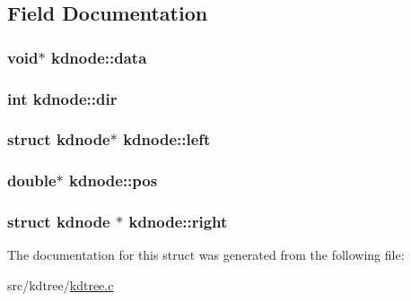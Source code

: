 \subsection{Field Documentation}
\hypertarget{structkdnode_ac14038f51e15cb1bb26abe6558d36a3d}{
\subsubsection[{data}]{\setlength{\rightskip}{0pt plus 5cm}void$\ast$ kdnode\+::data}}\label{structkdnode_ac14038f51e15cb1bb26abe6558d36a3d}
\hypertarget{structkdnode_aa3b02f2e7995f08cd16a85ea93e1fc80}{
\subsubsection[{dir}]{\setlength{\rightskip}{0pt plus 5cm}int kdnode\+::dir}}\label{structkdnode_aa3b02f2e7995f08cd16a85ea93e1fc80}
\hypertarget{structkdnode_a5011f2e53a829b362c8d034f005e6a04}{
\subsubsection[{left}]{\setlength{\rightskip}{0pt plus 5cm}struct {\bf kdnode}$\ast$ kdnode\+::left}}\label{structkdnode_a5011f2e53a829b362c8d034f005e6a04}
\hypertarget{structkdnode_af92e7d95a2845d3e8611b289d6398a83}{
\subsubsection[{pos}]{\setlength{\rightskip}{0pt plus 5cm}double$\ast$ kdnode\+::pos}}\label{structkdnode_af92e7d95a2845d3e8611b289d6398a83}
\hypertarget{structkdnode_a560fdae1b98325057e95c817f76bee67}{
\subsubsection[{right}]{\setlength{\rightskip}{0pt plus 5cm}struct {\bf kdnode} $\ast$ kdnode\+::right}}\label{structkdnode_a560fdae1b98325057e95c817f76bee67}


The documentation for this struct was generated from the following file\+:\begin{DoxyCompactItemize}
\item 
src/kdtree/\hyperlink{kdtree_8c}{kdtree.\+c}\end{DoxyCompactItemize}
